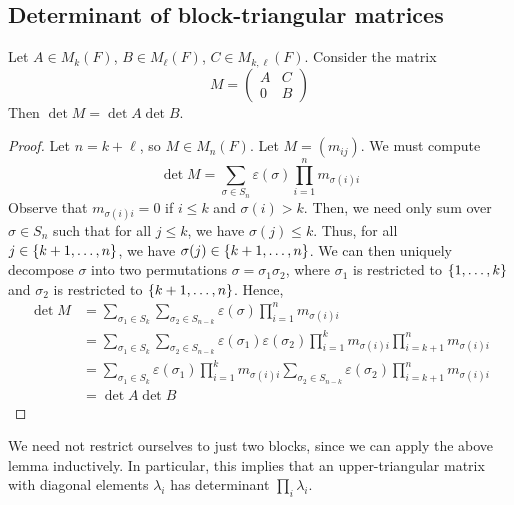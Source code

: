 \subsection{Determinant of block-triangular matrices}
\begin{lemma}
	Let \( A \in M_k(F) \), \( B \in M_\ell(F) \), \( C \in M_{k, \ell}(F) \).
	Consider the matrix
	\[
		M = \begin{pmatrix}
			A & C \\
			0 & B
		\end{pmatrix}
	\]
	Then \( \det M = \det A \det B \).
\end{lemma}
\begin{proof}
	Let \( n = k + \ell \), so \( M \in M_n(F) \).
	Let \( M = (m_{ij}) \).
	We must compute
	\[
		\det M = \sum_{\sigma \in S_n} \varepsilon(\sigma) \prod_{i=1}^n m_{\sigma(i) i}
	\]
	Observe that \( m_{\sigma(i) i} = 0 \) if \( i \leq k \) and \( \sigma(i) > k \).
	Then, we need only sum over \( \sigma \in S_n \) such that for all \( j \leq k \), we have \( \sigma(j) \leq k \).
	Thus, for all \( j \in \qty{k+1, \dots, n} \), we have \( \sigma(j) \in \qty{k+1, \dots, n} \).
	We can then uniquely decompose \( \sigma \) into two permutations \( \sigma = \sigma_1 \sigma_2 \), where \( \sigma_1 \) is restricted to \( \qty{1, \dots, k} \) and \( \sigma_2 \) is restricted to \( \qty{k+1, \dots, n} \).
	Hence,
	\begin{align*}
		\det M & = \sum_{\sigma_1 \in S_k} \sum_{\sigma_2 \in S_{n-k}} \varepsilon(\sigma) \prod_{i=1}^n m_{\sigma(i) i}                                                         \\
		       & = \sum_{\sigma_1 \in S_k} \sum_{\sigma_2 \in S_{n-k}} \varepsilon(\sigma_1) \varepsilon(\sigma_2) \prod_{i=1}^k m_{\sigma(i) i} \prod_{i=k+1}^n m_{\sigma(i) i} \\
		       & = \sum_{\sigma_1 \in S_k} \varepsilon(\sigma_1) \prod_{i=1}^k m_{\sigma(i) i} \sum_{\sigma_2 \in S_{n-k}} \varepsilon(\sigma_2) \prod_{i=k+1}^n m_{\sigma(i) i} \\
		       & = \det A \det B
	\end{align*}
\end{proof}
\begin{corollary}
	We need not restrict ourselves to just two blocks, since we can apply the above lemma inductively.
	In particular, this implies that an upper-triangular matrix with diagonal elements \( \lambda_i \) has determinant \( \prod_i \lambda_i \).
\end{corollary}
